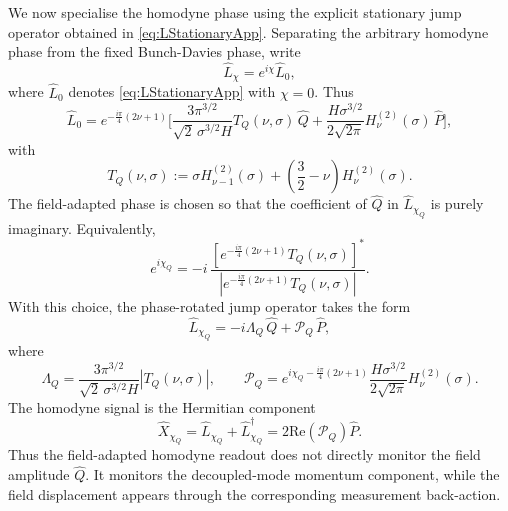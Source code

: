 \documentclass{article}
\numberwithin{equation}{section}
\begin{document}
	We now specialise the homodyne phase using the explicit stationary jump operator obtained in \cref{eq:LStationaryApp}. Separating the arbitrary homodyne phase from the fixed Bunch-Davies phase, write
	\begin{equation}
		\hat L_\chi = e^{i\chi}\hat L_0 ,
	\end{equation}
	where \(\hat L_0\) denotes \cref{eq:LStationaryApp} with \(\chi=0\). Thus
	\begin{equation}
		\hat L_0 = e^{-\tfrac{i\pi}{4}(2\nu+1)} \bigg[ \frac{3\pi^{3/2}}{\sqrt2\,\sigma^{3/2}H} T_Q(\nu,\sigma)\,\hat Q + \frac{H\sigma^{3/2}}{2\sqrt{2\pi}} H_\nu^{(2)}(\sigma)\,\hat P \bigg],
		\label{eq:L0FieldAdaptedApp}
	\end{equation}
	with
	\begin{equation}
		T_Q(\nu,\sigma) := \sigma H_{\nu-1}^{(2)}(\sigma) + \left( \frac32-\nu \right)H_\nu^{(2)}(\sigma).
		\label{eq:TQdefAppendix}
	\end{equation}
	The field-adapted phase is chosen so that the coefficient of \(\hat Q\) in \(\hat L_{\chi_Q}\) is purely imaginary. Equivalently,
	\begin{equation}
		e^{i\chi_Q} = -i\, \frac{ \left[ e^{-\tfrac{i\pi}{4}(2\nu+1)} T_Q(\nu,\sigma) \right]^* }{ \left| e^{-\tfrac{i\pi}{4}(2\nu+1)} T_Q(\nu,\sigma) \right| } .
		\label{eq:chiQDefNoAlphaBetaApp}
	\end{equation}
	With this choice, the phase-rotated jump operator takes the form
	\begin{equation}
		\hat L_{\chi_Q} = -i\Lambda_Q\,\hat Q + \mathcal P_Q\,\hat P,
		\label{eq:LchiQFormNoAlphaBetaApp}
	\end{equation}
	where
	\begin{equation}
		\Lambda_Q = \frac{3\pi^{3/2}}{\sqrt2\,\sigma^{3/2}H} \left|T_Q(\nu,\sigma)\right|, \qquad \mathcal P_Q = e^{i\chi_Q-\tfrac{i\pi}{4}(2\nu+1)} \frac{H\sigma^{3/2}}{2\sqrt{2\pi}} H_\nu^{(2)}(\sigma).
		\label{eq:PQLambdaQNoAlphaBetaApp}
	\end{equation}
	The homodyne signal is the Hermitian component
	\begin{equation}
		\hat X_{\chi_Q} = \hat L_{\chi_Q} + \hat L_{\chi_Q}^\dagger = 2\mathrm{Re}(\mathcal P_Q)\hat P .
		\label{eq:XchiQNoAlphaBetaApp}
	\end{equation}
	Thus the field-adapted homodyne readout does not directly monitor the field amplitude \(\hat Q\). It monitors the decoupled-mode momentum component, while the field displacement appears through the corresponding measurement back-action.
\end{document}
